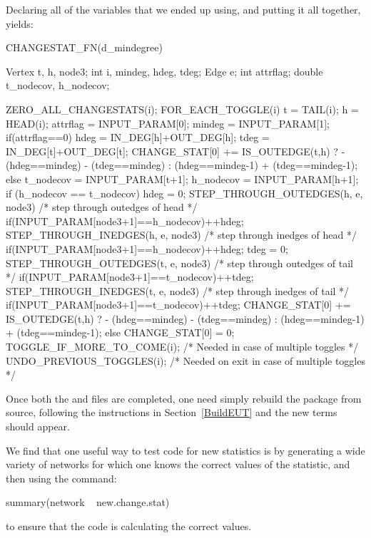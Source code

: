 \documentclass[nojss]{jss}
\begin{document}
Declaring all of the variables that we ended up using, and putting it all
together, yields:
\begin{CodeChunk}
\begin{CodeInput}
CHANGESTAT_FN(d_mindegree) {
  Vertex t, h, node3;
  int i, mindeg, hdeg, tdeg;
  Edge e;
  int attrflag;
  double t_nodecov, h_nodecov;

  ZERO_ALL_CHANGESTATS(i);
  FOR_EACH_TOGGLE(i) {
    t = TAIL(i); h = HEAD(i);
    attrflag = INPUT_PARAM[0];
    mindeg = INPUT_PARAM[1];
    if(attrflag==0){
      hdeg = IN_DEG[h]+OUT_DEG[h];
      tdeg = IN_DEG[t]+OUT_DEG[t];
      CHANGE_STAT[0] += IS_OUTEDGE(t,h) ?
        - (hdeg==mindeg) - (tdeg==mindeg) :
        (hdeg==mindeg-1) + (tdeg==mindeg-1);
    }else{
      t_nodecov = INPUT_PARAM[t+1];
      h_nodecov = INPUT_PARAM[h+1];
      if (h_nodecov == t_nodecov) {
        hdeg = 0;
        STEP_THROUGH_OUTEDGES(h, e, node3) { /* step through outedges of head */
          if(INPUT_PARAM[node3+1]==h_nodecov){++hdeg;}
        }
        STEP_THROUGH_INEDGES(h, e, node3) { /* step through inedges of head */
          if(INPUT_PARAM[node3+1]==h_nodecov){++hdeg;}
        }
        tdeg = 0;
        STEP_THROUGH_OUTEDGES(t, e, node3) { /* step through outedges of tail */
          if(INPUT_PARAM[node3+1]==t_nodecov){++tdeg;}
        }
        STEP_THROUGH_INEDGES(t, e, node3) { /* step through inedges of tail */
          if(INPUT_PARAM[node3+1]==t_nodecov){++tdeg;}
        }
        CHANGE_STAT[0] += IS_OUTEDGE(t,h) ?
          - (hdeg==mindeg) - (tdeg==mindeg) :
          (hdeg==mindeg-1) + (tdeg==mindeg-1);
      }else{
        CHANGE_STAT[0] = 0;
      }
    }
    TOGGLE_IF_MORE_TO_COME(i); /* Needed in case of multiple toggles */
  }
  UNDO_PREVIOUS_TOGGLES(i); /* Needed on exit in case of multiple toggles */
}
\end{CodeInput}
\end{CodeChunk}
Once both the  and  files are completed, one need simply rebuild the package from source, following the instructions in Section~\ref{BuildEUT} and the new terms should appear.

We find that one useful way to test code for new statistics is by generating a wide variety of networks for which one knows the correct values of the statistic, and then using the command:
\begin{CodeChunk}
\begin{CodeInput}
summary(network ~ new.change.stat)
\end{CodeInput}
\end{CodeChunk}
to ensure that the code is calculating the correct values.
\end{document}
